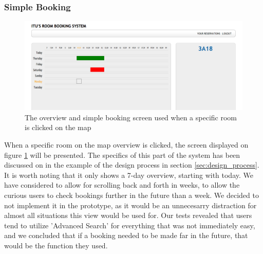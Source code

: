 \subsubsection*{Simple Booking}
\begin{figure}[htb]
\begin{center}
\leavevmode
\includegraphics[width=1\textwidth]{images/screens/simple_booking}
\end{center}
\caption{The overview and simple booking screen used when a specific room is clicked on the map}
\label{fig:simple_booking}
\end{figure}
When a specific room on the map overview is clicked, the screen displayed on figure \ref{fig:simple_booking} will be presented. The specifics of this part of the system has been discussed on in the example of the design process in section \ref{sec:design_process}.
It is worth noting that it only shows a 7-day overview, starting with today. We have considered to allow for scrolling back and forth in weeks, to allow the curious users to check bookings further in the future than a week.
We decided to not implement it in the prototype, as it would be an unnecesarry distraction for almost all situations this view would be used for.
Our tests revealed that users tend to utilize 'Advanced Search' for everything that was not immediately easy, and we concluded that if a booking needed to be made far in the future, that would be the function they used.

\pagebreak
